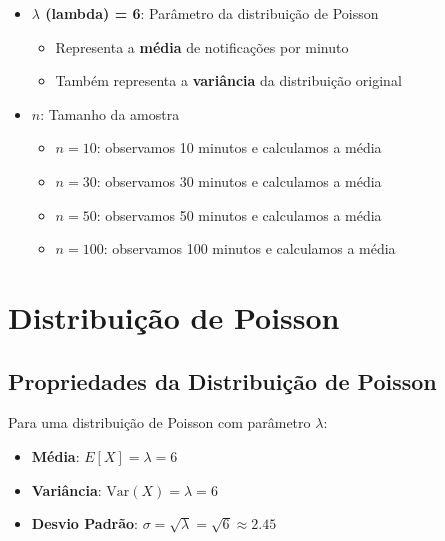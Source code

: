 \documentclass[12pt,a4paper]{article}
\begin{document}
\begin{itemize}
    \item \textbf{$\lambda$ (lambda) = 6}: Parâmetro da distribuição de Poisson
    \begin{itemize}
        \item Representa a \textbf{média} de notificações por minuto
        \item Também representa a \textbf{variância} da distribuição original
    \end{itemize}
    
    \item \textbf{$n$}: Tamanho da amostra
    \begin{itemize}
        \item $n = 10$: observamos 10 minutos e calculamos a média
        \item $n = 30$: observamos 30 minutos e calculamos a média
        \item $n = 50$: observamos 50 minutos e calculamos a média
        \item $n = 100$: observamos 100 minutos e calculamos a média
    \end{itemize}
\end{itemize}

\section{Distribuição de Poisson}


\subsection{Propriedades da Distribuição de Poisson}

Para uma distribuição de Poisson com parâmetro $\lambda$:
\begin{itemize}
    \item \textbf{Média}: $E[X] = \lambda = 6$
    \item \textbf{Variância}: $\text{Var}(X) = \lambda = 6$
    \item \textbf{Desvio Padrão}: $\sigma = \sqrt{\lambda} = \sqrt{6} \approx 2.45$
\end{itemize}

\end{document}
